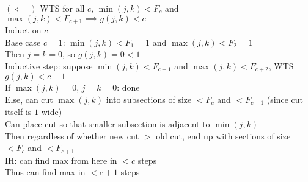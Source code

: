 \documentclass{article}
\begin{document}
$(\impliedby)$ WTS for all $c$,
$\min(j, k) < F_c$ and $\max(j, k) < F_{c+1} \implies g(j, k) < c$ \\
Induct on $c$ \\
Base case $c = 1$: $\min(j, k) < F_1 = 1$ and $\max(j, k) < F_2 = 1$ \\
Then $j = k = 0$, so $g(j, k) = 0 < 1$ \\
Inductive step: suppose $\min(j, k) < F_{c+1}$ and $\max(j, k) < F_{c+2}$,
WTS $g(j, k) < c+1$ \\
If $\max(j, k) = 0$, $j = k = 0$: done \\
Else, can cut $\max(j, k)$ into subsections of size $< F_c$ and $< F_{c+1}$
(since cut itself is $1$ wide) \\
Can place cut so that smaller subsection is adjacent to $\min(j, k)$ \\
Then regardless of whether new cut $>$ old cut,
end up with sections of size $< F_c$ and $< F_{c+1}$ \\
IH: can find max from here in $< c$ steps \\
Thus can find max in $< c+1$ steps \\
\end{document}
